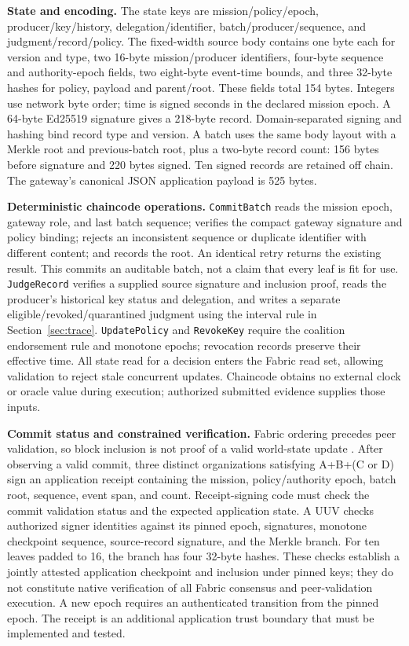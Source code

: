 \textbf{State and encoding.} The state keys are mission/policy/epoch, producer/key/history, delegation/identifier, batch/producer/sequence, and judgment/record/policy. The fixed-width source body contains one byte each for version and type, two 16-byte mission/producer identifiers, four-byte sequence and authority-epoch fields, two eight-byte event-time bounds, and three 32-byte hashes for policy, payload and parent/root. These fields total 154 bytes. Integers use network byte order; time is signed seconds in the declared mission epoch. A 64-byte Ed25519 signature gives a 218-byte record. Domain-separated signing and hashing bind record type and version. A batch uses the same body layout with a Merkle root and previous-batch root, plus a two-byte record count: 156 bytes before signature and 220 bytes signed. Ten signed records are retained off chain. The gateway's canonical JSON application payload is 525 bytes.

\textbf{Deterministic chaincode operations.} \texttt{CommitBatch} reads the mission epoch, gateway role, and last batch sequence; verifies the compact gateway signature and policy binding; rejects an inconsistent sequence or duplicate identifier with different content; and records the root. An identical retry returns the existing result. This commits an auditable batch, not a claim that every leaf is fit for use. \texttt{JudgeRecord} verifies a supplied source signature and inclusion proof, reads the producer's historical key status and delegation, and writes a separate eligible/revoked/quarantined judgment using the interval rule in Section~\ref{sec:trace}. \texttt{UpdatePolicy} and \texttt{RevokeKey} require the coalition endorsement rule and monotone epochs; revocation records preserve their effective time. All state read for a decision enters the Fabric read set, allowing validation to reject stale concurrent updates. Chaincode obtains no external clock or oracle value during execution; authorized submitted evidence supplies those inputs.

\textbf{Commit status and constrained verification.} Fabric ordering precedes peer validation, so block inclusion is not proof of a valid world-state update \citep{androulaki2018hyperledger,hyperledger2026fabric}. After observing a valid commit, three distinct organizations satisfying A+B+(C or D) sign an application receipt containing the mission, policy/authority epoch, batch root, sequence, event span, and count. Receipt-signing code must check the commit validation status and the expected application state. A UUV checks authorized signer identities against its pinned epoch, signatures, monotone checkpoint sequence, source-record signature, and the Merkle branch. For ten leaves padded to 16, the branch has four 32-byte hashes. These checks establish a jointly attested application checkpoint and inclusion under pinned keys; they do not constitute native verification of all Fabric consensus and peer-validation execution. A new epoch requires an authenticated transition from the pinned epoch. The receipt is an additional application trust boundary that must be implemented and tested.

